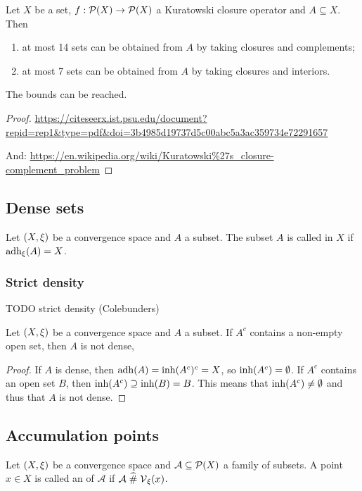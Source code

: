 \begin{theorem}
Let $X$ be a set, $f: \operatorname{\mathcal{P}}(X)\to\operatorname{\mathcal{P}}(X)$ a Kuratowski closure operator and $A\subseteq X$. Then
\begin{enumerate}
\item at most 14 sets can be obtained from $A$ by taking closures and complements;
\item at most 7 sets can be obtained from $A$ by taking closures and interiors.
\end{enumerate}
The bounds can be reached.
\end{theorem}
\begin{proof}
\url{https://citeseerx.ist.psu.edu/document?repid=rep1&type=pdf&doi=3b4985d19737d5c00abc5a3ac359734e72291657}

And: \url{https://en.wikipedia.org/wiki/Kuratowski%27s_closure-complement_problem}
\end{proof}

\subsection{Dense sets}
\begin{definition}
Let $\left( X, \xi \right)$ be a convergence space and $A$ a subset. The subset $A$ is called  in $X$ if $\operatorname{adh}_\xi(A) = X$.
\end{definition}

\subsubsection{Strict density}
TODO strict density (Colebunders)

\begin{lemma} \label{openDensityLemma}
Let $\left( X, \xi \right)$ be a convergence space and $A$ a subset.
If $A^c$ contains a non-empty open set, then $A$ is not dense,
\end{lemma}
\begin{proof}
If $A$ is dense, then $\operatorname{adh}(A) = \operatorname{inh}(A^c)^c = X$, so $\operatorname{inh}(A^c) = \emptyset$. If $A^c$ contains an open set $B$, then $\operatorname{inh}(A^c) \supseteq \operatorname{inh}(B) = B$. This means that $\operatorname{inh}(A^c) \neq \emptyset$ and thus that $A$ is not dense.
\end{proof}

\subsection{Accumulation points}
\begin{definition}
Let $\left( X,\xi \right)$ be a convergence space and $\mathcal{A}\subseteq \operatorname{\mathcal{P}}(X)$ a family of subsets. A point $x\in X$ is called an  of $\mathcal{A}$ if $\mathcal{A}\mathrel{\widehat{\#}} \operatorname{\mathcal{V}}_\xi(x)$.
\end{definition}

